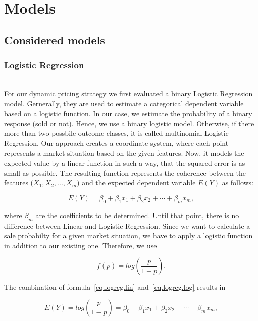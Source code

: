 \section{Models}
\subsection{Considered models}
\subsubsection{Logistic Regression}
    ~\\
    For our dynamic pricing strategy we first evaluated a binary Logistic Regression model. Gernerally, they are used to estimate a categorical dependent variable based on a logistic function. In our case, we estimate the probability of a binary response (sold or not). Hence, we use a binary logistic model. Otherwise, if there more than two possbile outcome classes, it is called multinomial Logistic Regression.
    Our approach creates a coordinate system, where each point represents a market situation based on the given features. Now, it models the expected value by a linear function in such a way, that the squared error is as small as possible. The resulting function represents the coherence between the features ($X_1, X_2, ..., X_m$) and the expected dependent variable $E(Y)$ as follows:

    \begin{equation}
    \label{eq.logreg.lin}
    E(Y) = \beta _{0}+\beta _{1}x_{1}+\beta _{2}x_{2}+\cdots +\beta _{m}x_{m},
    \end{equation}

    where $\beta _m$ are the coefficients to be determined. Until that point, there is no difference between Linear and Logistic Regression. Since we want to calculate a sale probabilty for a given market situation, we have to apply a logistic function in addition to our existing one. Therefore, we use

    \begin{equation}
    \label{eq.logreg.log}
    f(p)=log(\frac{p}{1-p}).
    \end{equation}

    The combination of formula~\ref{eq.logreg.lin} and~\ref{eq.logreg.log} results in

    \begin{equation}
    \label{eq.logreg.loglin}
    E(Y) = log(\frac{p}{1-p}) = \beta _{0}+\beta _{1}x_{1}+\beta _{2}x_{2}+\cdots +\beta _{m}x_{m},
    \end{equation}

